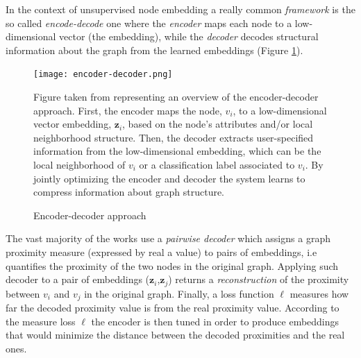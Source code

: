 In the context of unsupervised node embedding a really common \textit{framework} is the so called \textit{encode-decode} one where the \textit{encoder} maps each node to a low-dimensional vector (the embedding), while the \textit{decoder} decodes structural information about the graph from the learned embeddings (Figure \ref{fig:encoding_decoding}). 
\begin{figure}
\centering
\texttt{[image: encoder-decoder.png]}
\caption{Encoder-decoder approach}
Figure taken from \cite{representationLearning} representing an overview of the encoder-decoder approach. First, the encoder maps the node, \(v_i\), to a low-dimensional vector embedding, \(\textbf{z}_i\), based on the node's attributes and/or local neighborhood structure. Then, the decoder extracts user-specified information from the low-dimensional embedding, which can be the local neighborhood of \(v_i\) or a classification label associated to \(v_i\). By jointly optimizing the encoder and decoder the system learns to compress information about graph structure.
\label{fig:encoding_decoding}
\end{figure}
The vast majority of the works use a \textit{pairwise decoder} which assigns a graph proximity measure (expressed by real a value) to pairs of embeddings, i.e quantifies the proximity of the two nodes in the original graph. Applying such decoder to a pair of embeddings (\(\textbf{z}_i\),\(\textbf{z}_j\)) returns a \textit{reconstruction} of the proximity between \(v_i\) and \(v_j\) in the original graph. Finally, a loss function \(\ell\) measures how far the decoded proximity value is from the real proximity value. According to the measure loss \(\ell\) the encoder is then tuned in order to produce embeddings that would minimize the distance between the decoded proximities and the real ones. 

